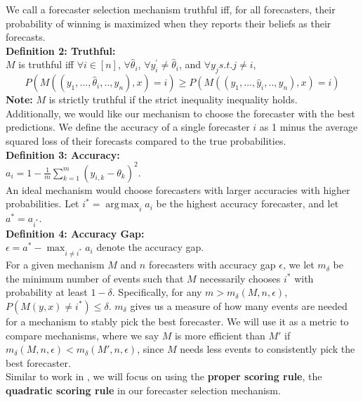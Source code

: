\documentclass[letterpaper,12pt]{article}
\DeclareMathOperator*{\argmax}{arg\,max}
\newcommand{\1}{\mathbbm{1}}
\begin{document}
We call a forecaster selection mechanism truthful iff, for all forecasters, their probability of winning is maximized when they reports their beliefs as their forecasts.\\

\textbf{Definition 2: Truthful:}\\
$M$ is truthful iff $\forall i \in [n]$, $\forall \hat{\theta}_i$, $\forall y^{\prime}_i \neq \hat{\theta}_i$, and $\forall y_j s.t. j \neq i$,
\[ P(M( (y_1, ..., \hat \theta_i, .., y_n), x ) = i) \geq  P(M( (y_1, ..., \hat y_i, .., y_n), x ) = i)\]
\textbf{Note:} $M$ is strictly truthful if the strict inequality inequality holds.\\

Additionally, we would like our mechanism to choose the forecaster with the best predictions. We define the accuracy of a single forecaster $i$ as 1 minus the average squared loss of their forecasts compared to the true probabilities.\\

\textbf{Definition 3: Accuracy:}\\
$a_i = 1 - \frac{1}{m}\sum_{k=1}^m (y_{i, k} - \theta_k)^2$.\\

An ideal mechanism would choose forecasters with larger accuracies with higher probabilities. Let $i^* = \argmax_i a_i$ be the highest accuracy forecaster, and let $a^* = a_{i^*}$.\\

\textbf{Definition 4: Accuracy Gap:}\\
$\epsilon = a^* - \max_{i \neq i^*} a_i$ denote the accuracy gap.\\

For a given mechanism $M$ and $n$ forecasters with accuracy gap $\epsilon$, we let $m_\delta$ be the minimum number of events such that $M$ necessarily chooses $i^*$ with probability at least $1 - \delta$. Specifically, for any $m > m_\delta(M, n, \epsilon)$, $P(M(y, x) \neq i^*) \leq \delta$. $m_\delta$ gives us a measure of how many events are needed for a mechanism to stably pick the best forecaster. We will use it as a metric to compare mechanisms, where we say $M$ is more efficient than $M'$ if $m_\delta(M, n, \epsilon) < m_\delta(M', n, \epsilon)$, since $M$ needs less events to consistently pick the best forecaster.\\

Similar to work in \cite{elf}, we will focus on using the \textbf{proper scoring rule}, the \textbf{quadratic scoring rule} in our forecaster selection mechanism.\\
\end{document}

